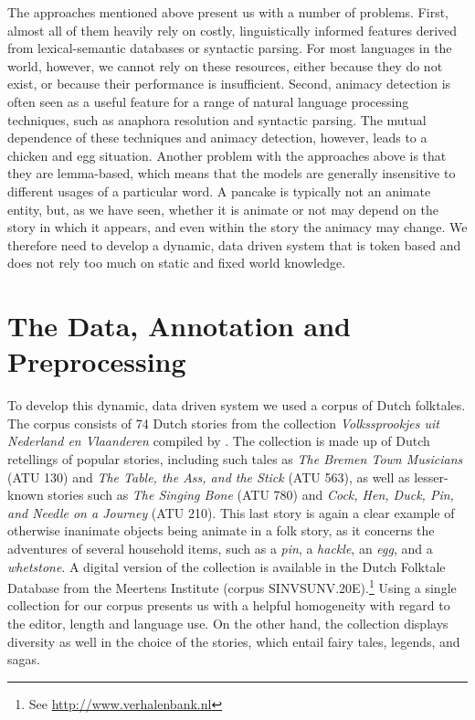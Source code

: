 \documentclass[a4paper,UKenglish]{oasics}
\begin{document}
The approaches mentioned above present us with a number of
problems. First, almost all of them heavily rely on costly,
linguistically informed features derived from lexical-semantic
databases or syntactic parsing. For most languages in the world,
however, we cannot rely on these resources, either because they do not
exist, or because their performance is insufficient.  Second, animacy
detection is often seen as a useful feature for a range of natural
language processing techniques, such as anaphora resolution and
syntactic parsing. The mutual dependence of these techniques and
animacy detection, however, leads to a chicken and egg
situation. Another problem with the approaches above is that they are
lemma-based, which means that the models are generally insensitive to
different usages of a particular word. A pancake is typically not an
animate entity, but, as we have seen, whether it is animate or not may
depend on the story in which it appears, and even within the story the
animacy may change. We therefore need to develop a dynamic, data
driven system that is token based and does not rely too much on static
and fixed world knowledge.

\section{The Data, Annotation and Preprocessing}\label{sec:data}

To develop this dynamic, data driven system we used a corpus of Dutch
folktales. The corpus consists of 74 Dutch stories from the collection
\textit{Volkssprookjes uit Nederland en Vlaanderen} compiled by
\cite{sinninghe:78}. The collection is made up of Dutch retellings of
popular stories, including such tales as \textit{The Bremen Town
  Musicians} (ATU 130) and \textit{The Table, the Ass, and the Stick }
(ATU 563), as well as lesser-known stories such as \textit{The Singing
  Bone} (ATU 780) and \textit{Cock, Hen, Duck, Pin, and Needle on a
  Journey} (ATU 210). This last story is again a clear example of
otherwise inanimate objects being animate in a folk story, as it
concerns the adventures of several household items, such as a
\textit{pin}, a \textit{hackle}, an \textit{egg}, and a
\textit{whetstone}. A digital version of the collection is available
in the Dutch Folktale Database from the Meertens Institute (corpus
SINVSUNV.20E).\footnote{See \url{http://www.verhalenbank.nl}} Using a
single collection for our corpus presents us with a helpful
homogeneity with regard to the editor, length and language use. On the
other hand, the collection displays diversity as well in the choice of
the stories, which entail fairy tales, legends, and sagas.
\end{document}
